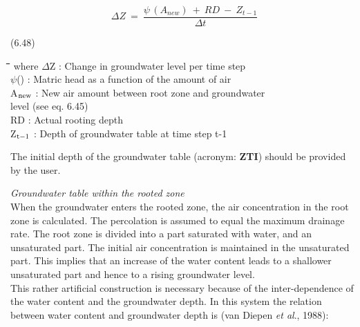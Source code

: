 \documentclass[11pt]{article}
\begin{document}
\begin{displaymath}
\Delta Z~=~{\frac{\psi \, (A _{new} ) ~+~RD~-~Z _{t-1} }{\Delta t}}
\end{displaymath}

 \bigskip
\strut\hfill (6.48)

\nwln
\begin{tabbing}
\hspace{1.27cm}\=\hspace{1.27cm}\=\hspace{1.27cm}\=\hspace{1.27cm}\=%
\hspace{1.27cm}\=\hspace{1.27cm}\=\hspace{1.27cm}\=\hspace{1.27cm}\=%
\hspace{1.27cm}\=\hspace{1.27cm}\=\kill
where\> $\Delta$Z\> : Change in groundwater level per time step\> \> \> \> \> \> \> \> [cm d$^{{\rm -1}}$]\\
\>$\psi$()\> : Matric head as a function of the amount of air\> \> \> \> \> \> \> \> [cm]\\
\>A$_{{\rm new}}$\> : New air amount between root zone and groundwater\\
\>\>   level (see eq. 6.45)\> \> \> \> \> \> \> \> [cm]\\
\>RD\> : Actual rooting depth\> \> \> \> \> \> \> \> [cm]\\
\>Z$_{{\rm t-1}}$\> : Depth of groundwater table at time step t-1\> \> \> \> \> \> \> \> [cm]
\end{tabbing}

\bigskip
\bigskip
The initial depth of the groundwater table (acronym: {\bf ZTI}) should be provided by the
user. 

\bigskip
 {\it Groundwater table within the rooted zone\/}\\
When the groundwater enters the rooted zone, the air concentration in the root zone is
calcu\-lated. The percolation is assumed to equal the maximum drainage rate. The root
zone is divided into a part saturated with water, and an unsaturated part. The initial air
concentration is maintained in the unsaturated part. This implies that an increase of the
water content leads to a shallower unsaturated part and hence to a rising groundwater
level. \\
This rather artificial construction is necessary because of the inter-dependence of the
water content and the groundwater depth. In this system the relation between water
content and groundwater depth is (van Diepen {\it et al\/}., 1988):
\end{document}
